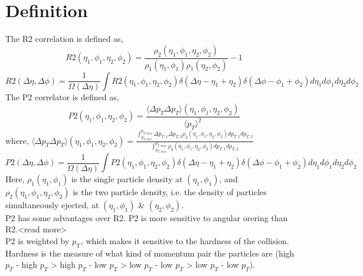 \documentclass[12pt,a4paper,twoside]{report}
\begin{document}
\section{Definition}
The R2 correlation  is defined as,
\begin{equation}\label{eq:R2(e1p1e2p2)}
	R2(\eta_1,\phi_1,\eta_2,\phi_2)=\frac{\rho_2(\eta_1,\phi_1,\eta_2,\phi_2)}{\rho_1(\eta_1,\phi_1)\rho_1(\eta_2,\phi_2)}-1
\end{equation}
\begin{equation}\label{eq:R2(dedp)}
	R2(\Delta\eta,\Delta\phi)=\frac{1}{\Omega(\Delta\eta)}\int R2(\eta_1,\phi_1,\eta_2,\phi_2)\delta(\Delta\eta-\eta_1+\eta_2)\delta(\Delta\phi-\phi_1+\phi_2)d\eta_1 d\phi_1 d\eta_2 d\phi_2
\end{equation}
The P2 correlator is defined as,
\begin{equation}\label{eq:P2(e1p1e2p2)}
	P2(\eta_1,\phi_1,\eta_2,\phi_2)=\frac{\langle\Delta p_T \Delta p_T \rangle(\eta_1,\phi_1,\eta_2,\phi_2)}{\langle p_T\rangle^2}
\end{equation}
	where, $\langle\Delta p_T \Delta p_T\rangle(\eta_1,\phi_1,\eta_2,\phi_2)=\frac{\int_{p_{T,min}}^{p_{T,max}}\Delta p_{T,1}\Delta p_{T,2}\rho_2(\eta_1,\phi_1,\eta_2,\phi_2)d p_{T,1}d p_{T,2}}{\int_{p_{T,min}}^{p_{T,max}}\rho_2(\eta_1,\phi_1,\eta_2,\phi_2)d p_{T,1}d p_{T,2}}$
\begin{equation}\label{eq:P2(dedp)}
	P2(\Delta\eta,\Delta\phi)=\frac{1}{\Omega(\Delta\eta)}\int P2(\eta_1,\phi_1,\eta_2,\phi_2)\delta(\Delta\eta-\eta_1+\eta_2)\delta(\Delta\phi-\phi_1+\phi_2)d\eta_1 d\phi_1 d\eta_2 d\phi_2
\end{equation}
Here, $\rho_1(\eta_1,\phi_1)$ is the single particle density at $(\eta_1,\phi_1)$, and $\rho_2(\eta_1,\phi_1,\eta_2,\phi_2)$ is the two particle density, i.e. the density of particles simultaneously ejected, at $(\eta_1,\phi_1)$ \& $(\eta_2,\phi_2)$.\\

P2 has some advantages over R2. P2 is more sensitive to angular orering than R2.<read more>\\
P2 is weighted by $p_\mathrm{T}$, which makes it sensitive to the hardness of the collision. Hardness is the measure of what kind of momentum pair the particles are (high $p_T$ - high $p_T$ > high $p_T$ - low $p_T$ > low $p_T$ - low $p_T$ > low $p_T$ - low $p_T$). 
\end{document}
